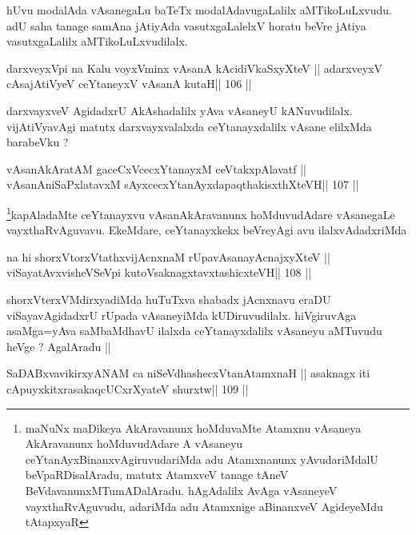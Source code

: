 \begin{artha}
hUvu modalAda vAsanegaLu baTeTx modalAdavugaLalilx aMTikoLuLxvudu. adU
saha tanage samAna jAtiyAda vasutxgaLalelxV horatu beVre jAtiya
vasutxgaLalilx aMTikoLuLxvudilalx.
\end{artha}

\begin{shl}
darxveyxV\s pi na Kalu voyxVminx vAsanA kAcidiVkaSxyXteV ||
adarxveyxV cAsajAtiVyeV ceYtaneyxV vAsanA kutaH\hfill || 106 ||
\end{shl}

\begin{artha}
darxvayxveV AgidadxrU AkAshadalilx yAva vAsaneyU kANuvudilalx.
vijAtiVyavAgi matutx darxvayxvalalxda ceYtanayxdalilx vAsane elilxMda
barabeVku ?
\end{artha}

\begin{shl}
vAsanAkAratAM gaceCxVcecxYtanayxM ceVtakxpAlavatf ||
vAsanAniSaPxlatavxM sAyxcecxYtanAyxdapaqthakisxthXteVH\hfill || 107 ||
\end{shl}

\begin{artha}
\footnote[1]{maNuNx maDikeya AkAravanunx hoMduvaMte Atamxnu vAsaneya
  AkAravanunx hoMduvudAdare A vAsaneyu ceYtanAyxBinanxvAgiruvudariMda
  adu Atamxnanunx yAvudariMdalU beVpaRDisalAradu, matutx AtamxveV
  tanage tAneV BeVdavanunxMTumADalAradu. hAgAdalilx AvAga vAsaneyeV
  vayxthaRvAguvudu, adariMda adu Atamxnige aBinanxveV AgideyeMdu tAtapxyaR}kapAladaMte ceYtanayxvu vAsanAkAravanunx hoMduvudAdare
vAsanegaLe vayxthaRvAguvavu. EkeMdare, ceYtanayxkekx beVreyAgi avu
ilalxvAdadxriMda
\end{artha}



\begin{shl}
na hi shorxVtorxVtathxvijAcnxnaM rUpavAsanayA\s cnajxyXteV ||
viSayatAvxvisheVSeV\s pi kutoV\s saknagxtavxtashicxteVH\hfill || 108 ||
\end{shl}

\begin{artha}
shorxVterxVMdirxyadiMda huTuTxva shabadx jAcnxnavu eraDU
viSayavAgidadxrU rUpada vAsaneyiMda kUDiruvudilalx. hiVgiruvAga
asaMga=yAva saMbaMdhavU ilalxda ceYtanayxdalilx vAsaneyu aMTuvudu
heVge ? AgalAradu ||
\end{artha}

\begin{shl}
SaDABxvavikirxyANAM ca niSeVdhashecxVtanAtamxnaH ||
asaknagx iti cApuyxkitxrasakaqcUCxrXyateV shurxtw\hfill || 109 ||
\end{shl}

